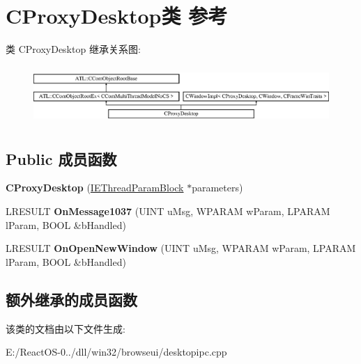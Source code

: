 \hypertarget{class_c_proxy_desktop}{}\section{C\+Proxy\+Desktop类 参考}
\label{class_c_proxy_desktop}
类 C\+Proxy\+Desktop 继承关系图\+:\begin{figure}[H]
\begin{center}
\leavevmode
\includegraphics[height=2.245989cm]{class_c_proxy_desktop}
\end{center}
\end{figure}
\subsection*{Public 成员函数}
\begin{DoxyCompactItemize}
\item 
\mbox{\label{class_c_proxy_desktop_a545f71449ee2abe199f290a71fa45c8f}} 
{\bfseries C\+Proxy\+Desktop} (\hyperlink{struct_i_e_thread_param_block}{I\+E\+Thread\+Param\+Block} $\ast$parameters)
\item 
\mbox{\label{class_c_proxy_desktop_a480c835a5be63201ef3af160687962b3}} 
L\+R\+E\+S\+U\+LT {\bfseries On\+Message1037} (U\+I\+NT u\+Msg, W\+P\+A\+R\+AM w\+Param, L\+P\+A\+R\+AM l\+Param, B\+O\+OL \&b\+Handled)
\item 
\mbox{\label{class_c_proxy_desktop_af1f9fb7cccd48bac95fd50c63048f353}} 
L\+R\+E\+S\+U\+LT {\bfseries On\+Open\+New\+Window} (U\+I\+NT u\+Msg, W\+P\+A\+R\+AM w\+Param, L\+P\+A\+R\+AM l\+Param, B\+O\+OL \&b\+Handled)
\end{DoxyCompactItemize}
\subsection*{额外继承的成员函数}


该类的文档由以下文件生成\+:\begin{DoxyCompactItemize}
\item 
E\+:/\+React\+O\+S-\/0../dll/win32/browseui/desktopipc.\+cpp\end{DoxyCompactItemize}
